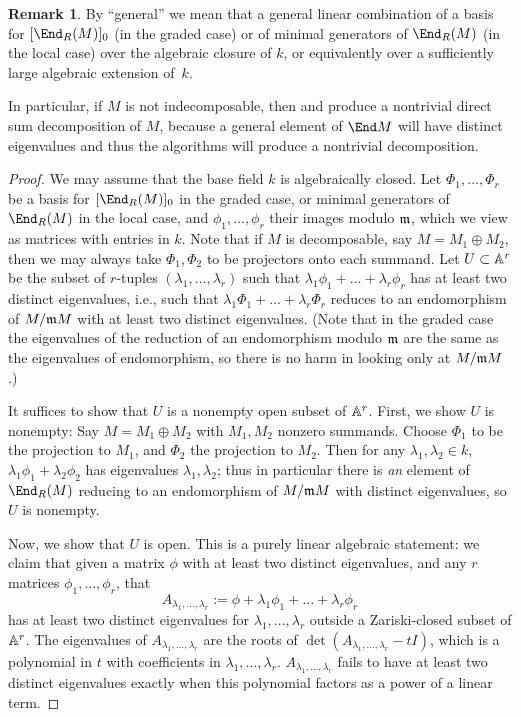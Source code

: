 \documentclass[12pt]{article}
\let\l\lambda
\theoremstyle{theorem}
\numberwithin{thm}{section}
\theoremstyle{definition}
\newtheorem{rem}[thm]{Remark}
\begin{document}
\begin{rem}
  By ``general'' we mean that a general linear combination of a basis for $[\End_R(M)]_0$ (in the graded case) or of minimal generators of $\End_R(M)$ (in the local case) over the algebraic closure of $k$, or equivalently over a sufficiently large algebraic extension of~$k$.
\end{rem}



In particular, if $M$ is not indecomposable, then  and  produce a nontrivial direct sum decomposition of $M$, because a general element of $\End M$ will have distinct eigenvalues and thus the algorithms will produce a nontrivial decomposition.

\begin{proof}
  We may assume that the base field $k$ is algebraically closed.
  Let $\Phi_1,\dots,\Phi_r$ be a basis for $[\End_R(M)]_0$ in the graded case, or minimal generators of $\End_R(M)$ in the local case, and $\phi_1,\dots,\phi_r$ their images modulo $\mathfrak m$, which we view as matrices with entries in $k$.
  Note that if $M$ is decomposable, say $M=M_1\oplus M_2$, then we may always take $\Phi_1,\Phi_2$ to be projectors onto each summand.
  Let $U\subset \mathbb A^r$ be the subset of $r$-tuples $(\l_1,\dots,\l_r)$ such that $\l_1\phi_1+\dots+\l_r\phi_r$ has at least two distinct eigenvalues, i.e., such that $\l_1\Phi_1+\dots+\l_r\Phi_r$ reduces to an endomorphism of $M/\mathfrak m M$ with at least two distinct eigenvalues. (Note that in the graded case the eigenvalues of the reduction of an endomorphism modulo $\mathfrak m$ are the same as the eigenvalues of endomorphism, so there is no harm in looking only at $M/\mathfrak m M$.)

  It suffices to show that $U$ is a nonempty open subset of $\mathbb A^r$. First, we show $U$ is nonempty:
  Say $M=M_1\oplus M_2$ with $M_1,M_2$  nonzero  summands. Choose $\Phi_1$ to be the projection to $M_1$, and $\Phi_2$ the projection to $M_2$. Then for any $\l_1,\l_2\in k$, $\l_1\phi_1 + \l_2\phi_2$ has eigenvalues $\l_1,\l_2$; thus in particular there is \emph{an} element of $\End_R(M)$ reducing to an endomorphism of $M/\mathfrak m M$ with distinct eigenvalues, so $U$ is nonempty.

  Now, we show that $U$ is open. This is a purely linear algebraic statement: we claim that given a matrix $\phi$ with at least two distinct eigenvalues, and any $r$ matrices $\phi_1,\dots,\phi_r$, that
  $$ A_{\l_1,\dots,\l_r}:=\phi+\l_1\phi_1+\dots+\l_r\phi_r $$
  has at least two distinct eigenvalues for $\l_1,\dots,\l_r$ outside a Zariski-closed subset of $\mathbb A^r$.
  The eigenvalues of $A_{\l_1,\dots,\l_r}$ are the roots of $\det(A_{\l_1,\dots,\l_r}-t I)$, which is a polynomial in $t$ with coefficients in $\l_1,\dots,\l_r$.
  $A_{\l_1,\dots,\l_r}$ fails to have at least two distinct eigenvalues exactly when this polynomial factors as a power of a linear term.


\end{proof}
\end{document}
